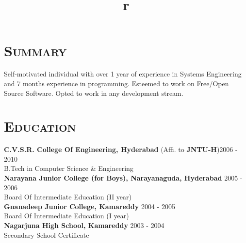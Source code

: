 \begin{resume}




\section{\textsc{Summary}}
Self-motivated individual with over 1 year of experience in Systems
Engineering and 7 months experience in programming. Esteemed to work
on Free/Open Source Software. Opted to work in any development stream.
\\
 
\section{\textsc{Education}}

\textbf{C.V.S.R. College Of Engineering, Hyderabad} (Affi. to \textbf{JNTU-H})\hfill 2006 - 2010 \\
B.Tech in Computer Science \& Engineering\hfill \\
\newline
\textbf{Narayana Junior College (for Boys), Narayanaguda, Hyderabad} \hfill 2005 - 2006 \\ 
Board Of Intermediate Education (II year) \\
\textbf{Gnanadeep Junior College, Kamareddy} \hfill 2004 - 2005\\
Board Of Intermediate Education (I year) \\
\newline
\textbf{Nagarjuna High School, Kamareddy} \hfill 2003 - 2004 \\
Secondary School Certificate
\\


\begin{formatb}
  \title{r}\\
  \\
  \body\\
\end{formatb}


\end{resume}
